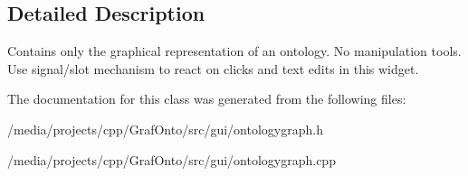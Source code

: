 \subsection{\-Detailed \-Description}
\-Contains only the graphical representation of an ontology. \-No manipulation tools. \-Use signal/slot mechanism to react on clicks and text edits in this widget. 

\-The documentation for this class was generated from the following files\-:\begin{DoxyCompactItemize}
\item 
/media/projects/cpp/\-Graf\-Onto/src/gui/ontologygraph.\-h\item 
/media/projects/cpp/\-Graf\-Onto/src/gui/ontologygraph.\-cpp\end{DoxyCompactItemize}
